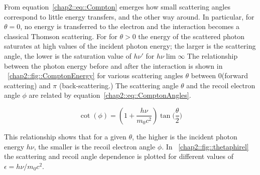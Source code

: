 From equation~\ref{chap2::eq::Compton} emerges how small scattering angles correspond to little energy transfers, and the other way around. In particular, for $\theta = 0$, no energy is transferred to the electron and the interaction becomes a classical Thomson scattering. For for $\theta > 0$ the energy of the scattered photon saturates at high values of the incident photon energy; the larger is the scattering angle, the lower is the saturation value of $h\nu'$ for $h\nu \lim \infty$
The relationship between the photon energy before and after the interaction is shown in \figurename~\ref{chap2::fig::ComptonEnergy} for various scattering angles $\theta$ between 0\textdegree (forward scattering) and $\pi$ (back-scattering.) 
The scattering angle $\theta$ and the recoil electron angle $\phi$ are related by equation~\ref{chap2::eq::ComptonAngles}.

\begin{equation}
\cot(\phi) = (1+\frac{h\nu}{m_{0}c^2})\tan\bigg(\frac{\theta}{2}\bigg)
\label{chap2::eq::ComptonAngles}
\end{equation} 

This relationship shows that for a given $\theta$, the higher is the incident photon energy $h\nu$, the smaller is the recoil electron angle $\phi$. In \figurename~\ref{chap2::fig::thetaphirel} the scattering and recoil angle dependence is plotted for different values of $\epsilon = h\nu / m_{0}c^2$.

